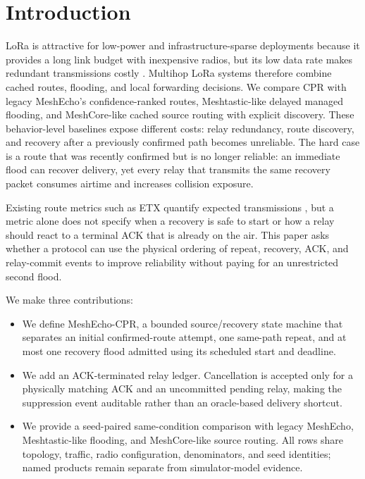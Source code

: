 \documentclass[conference,letterpaper,10pt]{IEEEtran}
\begin{document}
\section{Introduction}
LoRa is attractive for low-power and infrastructure-sparse deployments because
it provides a long link budget with inexpensive radios, but its low data rate
makes redundant transmissions costly \cite{augustin2016study}. Multihop LoRa
systems therefore combine cached routes, flooding, and local forwarding
decisions. We compare CPR with legacy MeshEcho's confidence-ranked routes,
Meshtastic-like delayed managed flooding, and MeshCore-like cached source
routing with explicit discovery. These behavior-level baselines expose
different costs: relay redundancy, route discovery, and recovery after a
previously confirmed path becomes unreliable.
The hard case is a route that was recently confirmed but is no longer reliable:
an immediate flood can recover delivery, yet every relay that transmits the
same recovery packet consumes airtime and increases collision exposure.

Existing route metrics such as ETX quantify expected transmissions
\cite{decouto2003etx}, but a metric alone does not specify when a recovery is
safe to start or how a relay should react to a terminal ACK that is already on
the air. This paper asks whether a protocol can use the physical ordering of
repeat, recovery, ACK, and relay-commit events to improve reliability without
paying for an unrestricted second flood.

We make three contributions:
\begin{itemize}
\item We define MeshEcho-CPR, a bounded source/recovery state machine that
  separates an initial confirmed-route attempt, one same-path repeat, and at
  most one recovery flood admitted using its scheduled start and deadline.
\item We add an ACK-terminated relay ledger. Cancellation is accepted only for
  a physically matching ACK and an uncommitted pending relay, making the
  suppression event auditable rather than an oracle-based delivery shortcut.
\item We provide a seed-paired same-condition
  comparison with legacy MeshEcho,
  Meshtastic-like flooding, and MeshCore-like source routing. All rows share
  topology, traffic, radio configuration, denominators, and seed identities;
  named products remain separate from simulator-model evidence.
\end{itemize}
\end{document}
